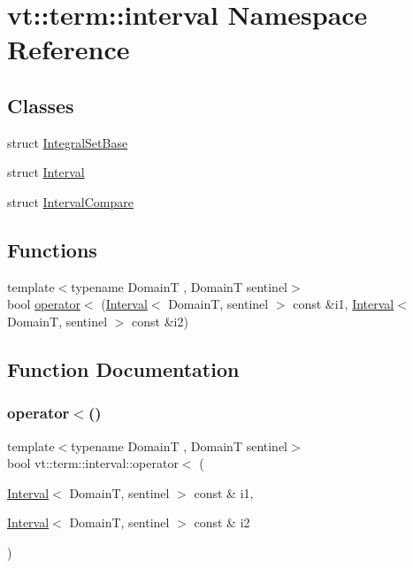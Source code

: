 \hypertarget{namespacevt_1_1term_1_1interval}{}\section{vt\+:\+:term\+:\+:interval Namespace Reference}
\label{namespacevt_1_1term_1_1interval}
\subsection*{Classes}
\begin{DoxyCompactItemize}
\item 
struct \hyperlink{structvt_1_1term_1_1interval_1_1_integral_set_base}{Integral\+Set\+Base}
\item 
struct \hyperlink{structvt_1_1term_1_1interval_1_1_interval}{Interval}
\item 
struct \hyperlink{structvt_1_1term_1_1interval_1_1_interval_compare}{Interval\+Compare}
\end{DoxyCompactItemize}
\subsection*{Functions}
\begin{DoxyCompactItemize}
\item 
{\footnotesize template$<$typename DomainT , DomainT sentinel$>$ }\\bool \hyperlink{namespacevt_1_1term_1_1interval_a389d50e78b21fe2724432fcc75db6f4b}{operator$<$} (\hyperlink{structvt_1_1term_1_1interval_1_1_interval}{Interval}$<$ DomainT, sentinel $>$ const \&i1, \hyperlink{structvt_1_1term_1_1interval_1_1_interval}{Interval}$<$ DomainT, sentinel $>$ const \&i2)
\end{DoxyCompactItemize}


\subsection{Function Documentation}
\mbox{\label{namespacevt_1_1term_1_1interval_a389d50e78b21fe2724432fcc75db6f4b}} 
\subsubsection{\texorpdfstring{operator$<$()}{operator<()}}
{\footnotesize\ttfamily template$<$typename DomainT , DomainT sentinel$>$ \\
bool vt\+::term\+::interval\+::operator$<$ (\begin{DoxyParamCaption}\item[{\hyperlink{structvt_1_1term_1_1interval_1_1_interval}{Interval}$<$ DomainT, sentinel $>$ const \&}]{i1,  }\item[{\hyperlink{structvt_1_1term_1_1interval_1_1_interval}{Interval}$<$ DomainT, sentinel $>$ const \&}]{i2 }\end{DoxyParamCaption})}

